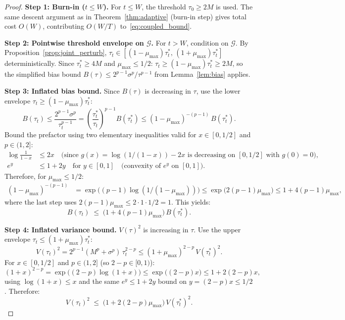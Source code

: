 \documentclass[11pt]{article}
\theoremstyle{definition}
\begin{document}
\begin{proof}
\textbf{Step 1: Burn-in ($t \leq W$).}
For $t \leq W$, the threshold $\tau_0 \geq 2M$ is used. The same descent
argument as in Theorem~\ref{thm:adaptive} (burn-in step) gives total cost
$O(W)$, contributing $O(W/T)$ to~\eqref{eq:coupled_bound}.

\medskip
\textbf{Step 2: Pointwise threshold envelope on $\mathcal{G}$.}
For $t > W$, condition on $\mathcal{G}$. By
Proposition~\ref{prop:joint_perturb},
$\tau_t \in [(1-\mu_{\max})\tau_t^{*},\, (1+\mu_{\max})\tau_t^{*}]$
deterministically. Since $\tau_t^{*} \geq 4M$ and $\mu_{\max} \leq 1/2$:
$\tau_t \geq (1-\mu_{\max})\tau_t^{*} \geq 2M$, so the simplified bias
bound $B(\tau) \leq 2^{p-1}\sigma^p/\tau^{p-1}$ from
Lemma~\ref{lem:bias} applies.

\medskip
\textbf{Step 3: Inflated bias bound.}
Since $B(\tau)$ is decreasing in $\tau$, use the lower envelope
$\tau_t \geq (1-\mu_{\max})\tau_t^{*}$:
\[
  B(\tau_t) \leq \frac{2^{p-1}\sigma^p}{\tau_t^{p-1}}
  = \left(\frac{\tau_t^{*}}{\tau_t}\right)^{p-1} B(\tau_t^{*})
  \leq (1-\mu_{\max})^{-(p-1)}\, B(\tau_t^{*}).
\]
Bound the prefactor using two elementary inequalities valid for
$x \in [0, 1/2]$ and $p \in (1, 2]$:
\begin{align*}
  \log\!\frac{1}{1-x} &\leq 2x \quad\text{(since $g(x) = \log(1/(1-x)) - 2x$ is decreasing on $[0, 1/2]$ with $g(0) = 0$)}, \\
  e^y &\leq 1 + 2y \quad\text{for } y \in [0, 1] \quad\text{(convexity of $e^y$ on $[0,1]$)}.
\end{align*}
Therefore, for $\mu_{\max} \leq 1/2$:
\begin{align*}
  (1-\mu_{\max})^{-(p-1)}
  &= \exp\!\bigl((p-1)\log(1/(1-\mu_{\max}))\bigr)
  \leq \exp\!\bigl(2(p-1)\mu_{\max}\bigr)
  \leq 1 + 4(p-1)\mu_{\max},
\end{align*}
where the last step uses $2(p-1)\mu_{\max} \leq 2 \cdot 1 \cdot 1/2 = 1$.
This yields:
\begin{equation}\label{eq:bias_phi_inflate}
  B(\tau_t) \;\leq\; \bigl(1 + 4(p-1)\mu_{\max}\bigr)\, B(\tau_t^{*}).
\end{equation}

\medskip
\textbf{Step 4: Inflated variance bound.}
$V(\tau)^2$ is increasing in $\tau$. Use the upper envelope
$\tau_t \leq (1+\mu_{\max})\tau_t^{*}$:
\[
  V(\tau_t)^2 = 2^{p-1}(M^p + \sigma^p)\,\tau_t^{2-p}
  \leq (1+\mu_{\max})^{2-p}\, V(\tau_t^{*})^2.
\]
For $x \in [0, 1/2]$ and $p \in (1, 2]$ (so $2-p \in [0, 1)$):
\[
  (1+x)^{2-p} = \exp\!\bigl((2-p)\log(1+x)\bigr)
  \leq \exp\!\bigl((2-p) x\bigr)
  \leq 1 + 2(2-p)x,
\]
using $\log(1+x) \leq x$ and the same $e^y \leq 1+2y$ bound on
$y = (2-p)x \leq 1/2$. Therefore:
\begin{equation}\label{eq:var_phi_inflate}
  V(\tau_t)^2 \;\leq\; \bigl(1 + 2(2-p)\mu_{\max}\bigr)\, V(\tau_t^{*})^2.
\end{equation}


\end{proof}
\end{document}
